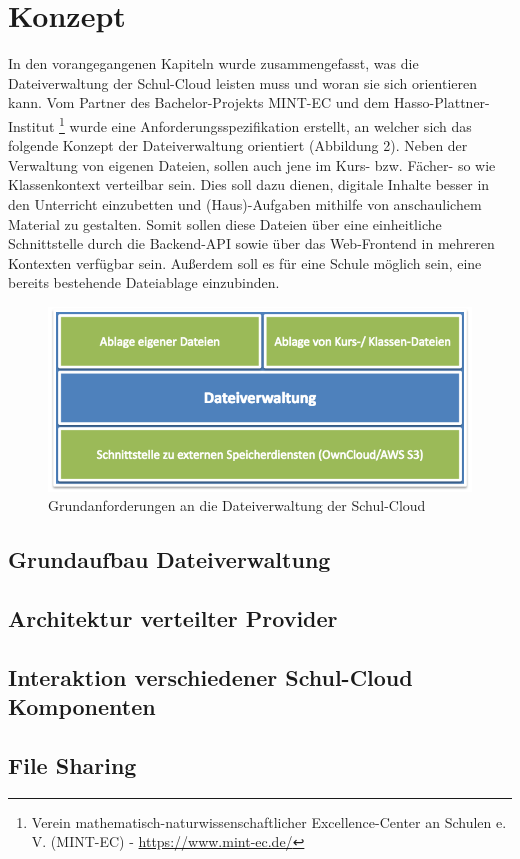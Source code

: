 \section{Konzept}
\label{sec:concept}

In den vorangegangenen Kapiteln wurde zusammengefasst, was die Dateiverwaltung der Schul-Cloud leisten muss und woran sie sich orientieren kann. Vom Partner des Bachelor-Projekts MINT-EC und dem Hasso-Plattner-Institut \footnote{Verein mathematisch-naturwissenschaftlicher Excellence-Center an Schulen e. V. (MINT-EC) - \url{https://www.mint-ec.de/}} wurde eine Anforderungsspezifikation erstellt, an welcher sich das folgende Konzept der Dateiverwaltung orientiert (Abbildung 2). Neben der Verwaltung von eigenen Dateien, sollen auch  jene im Kurs- bzw. Fächer- so wie Klassenkontext verteilbar sein. Dies soll dazu dienen, digitale Inhalte besser in den Unterricht einzubetten und (Haus)-Aufgaben mithilfe von anschaulichem Material zu gestalten. Somit sollen diese Dateien über eine einheitliche Schnittstelle durch die Backend-API sowie über das Web-Frontend in mehreren Kontexten verfügbar sein. Außerdem soll es für eine Schule möglich sein, eine bereits bestehende Dateiablage einzubinden. 

\begin{center}
	
	\begin{figure}[H]
		\begin{center}
			\includegraphics[width=0.8\linewidth]{images/AnforderungenDateiverwaltung}
			\caption[Caption for relatedWork]{Grundanforderungen an die Dateiverwaltung der Schul-Cloud\footnotemark}
			\label{fig:devices}
		\end{center}
	\end{figure}
\end{center}

\subsection{Grundaufbau Dateiverwaltung}

\subsection{Architektur verteilter Provider}

\subsection{Interaktion verschiedener Schul-Cloud Komponenten}

\subsection{File Sharing}

\clearpage
